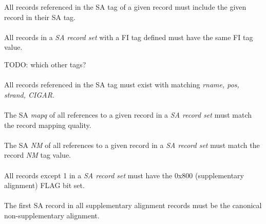 \documentclass[10pt]{article}
\begin{document}
All records referenced in the SA tag of a given record must include the given
record in their SA tag.

\paragraph{}

All records in a \textit{SA record set} with a FI tag defined must have the same FI tag value.

TODO: which other tags?

\paragraph{}

All records referenced in the SA tag must exist with matching \textit{rname, pos, strand, CIGAR}.

\paragraph{}

The SA \textit{mapq} of all references to a given record in a \textit{SA record set} must
match the record mapping quality.

\paragraph{}

The SA \textit{NM} of all references to a given record in a \textit{SA record set} must
match the record \textit{NM} tag value.

\paragraph{}

All records except 1 in a \textit{SA record set} must have the 0x800 (supplementary alignment) FLAG bit set.

\paragraph{}

The first SA record in all supplementary alignment records must be the canonical non-supplementary alignment.

\paragraph{}
\end{document}
